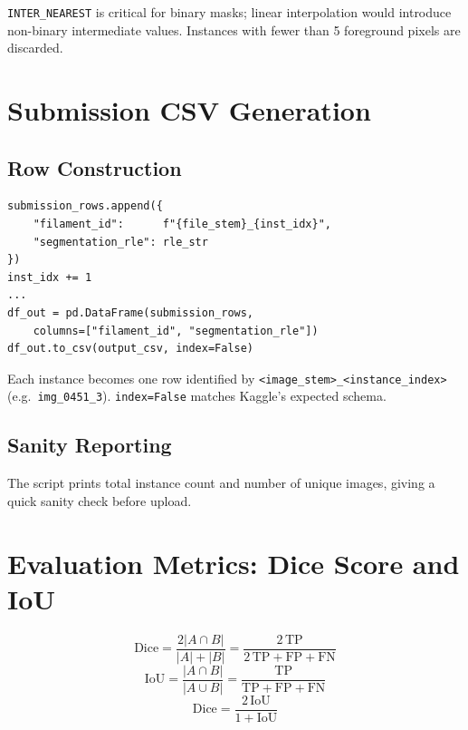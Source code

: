 \documentclass[11pt,a4paper,openany]{report}
\begin{document}
\texttt{INTER\_NEAREST} is critical for binary masks; linear interpolation would introduce
non-binary intermediate values. Instances with fewer than 5 foreground pixels are discarded.

\chapter{Submission CSV Generation}

\section{Row Construction}

\begin{lstlisting}[caption={Building the submission DataFrame},label={lst:csv}]
submission_rows.append({
    "filament_id":      f"{file_stem}_{inst_idx}",
    "segmentation_rle": rle_str
})
inst_idx += 1
...
df_out = pd.DataFrame(submission_rows,
    columns=["filament_id", "segmentation_rle"])
df_out.to_csv(output_csv, index=False)
\end{lstlisting}

Each instance becomes one row identified by
\texttt{<image\_stem>\_<instance\_index>} (e.g.\ \texttt{img\_0451\_3}).
\texttt{index=False} matches Kaggle's expected schema.

\section{Sanity Reporting}

The script prints total instance count and number of unique images, giving a quick sanity
check before upload.

\chapter{Evaluation Metrics: Dice Score and IoU}

\[
  \text{Dice} = \frac{2|A \cap B|}{|A| + |B|}
              = \frac{2\,\text{TP}}{2\,\text{TP} + \text{FP} + \text{FN}}
\]
\[
  \text{IoU}  = \frac{|A \cap B|}{|A \cup B|}
              = \frac{\text{TP}}{\text{TP} + \text{FP} + \text{FN}}
\]
\[
  \text{Dice} = \frac{2\,\text{IoU}}{1 + \text{IoU}}
\]
\end{document}
